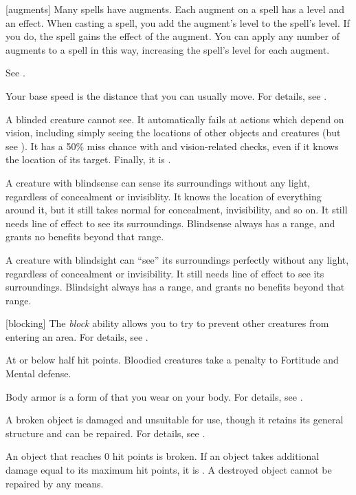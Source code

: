 [augments] Many spells have augments.
Each augment on a spell has a level and an effect.
When casting a spell, you add the augment's level to the spell's level.
If you do, the spell gains the effect of the augment.
You can apply any number of augments to a spell in this way, increasing the spell's level for each augment.

 See .

 Your base speed is the distance that you can usually move.
For details, see .

 A blinded creature cannot see. It automatically fails at actions which depend on vision, including simply seeing the locations of other objects and creatures (but see ). It has a 50\% miss chance with  and vision-related checks, even if it knows the location of its target. Finally, it is .

 A creature with blindsense can sense its surroundings without any light, regardless of concealment or invisiblity.
It knows the location of everything around it, but it still takes normal  for concealment, invisibility, and so on.
It still needs line of effect to see its surroundings.
Blindsense always has a range, and grants no benefits beyond that range.

 A creature with blindsight can ``see'' its surroundings perfectly without any light, regardless of concealment or invisibility.
It still needs line of effect to see its surroundings.
Blindsight always has a range, and grants no benefits beyond that range.

[blocking] The \textit{block} ability allows you to try to prevent other creatures from entering an area.
For details, see .

 At or below half hit points. Bloodied creatures take a  penalty to Fortitude and Mental defense.

 Body armor is a form of  that you wear on your body.
For details, see .

 A broken object is damaged and unsuitable for use, though it retains its general structure and can be repaired.
For details, see .

An object that reaches 0 hit points is broken. If an object takes additional damage equal to its maximum hit points, it is . A destroyed object cannot be repaired by any means.


